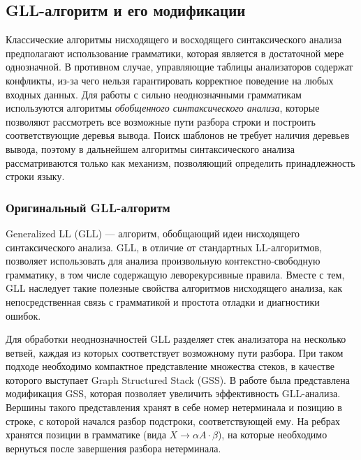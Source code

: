 \subsection{GLL-алгоритм и его модификации}

Классические алгоритмы нисходящего и восходящего синтаксического анализа предполагают использование грамматики, которая является в достаточной мере однозначной. 
В противном случае, управляющие таблицы анализаторов содержат конфликты, из-за чего нельзя гарантировать корректное поведение на любых входных данных. 
Для работы с сильно неоднозначными грамматикам используются алгоритмы \textit{обобщенного синтаксического анализа}, которые позволяют рассмотреть все возможные пути разбора строки и построить соответствующие деревья вывода.
Поиск шаблонов не требует наличия деревьев вывода, поэтому в дальнейшем алгоритмы синтаксического анализа рассматриваются только как механизм, позволяющий определить принадлежность строки языку.

\subsubsection{Оригинальный GLL-алгоритм}

Generalized LL (GLL) \cite{gll} --- алгоритм, обобщающий идеи нисходящего синтаксического анализа. GLL, в отличие от стандартных LL-алгоритмов, позволяет использовать для анализа произвольную \linebreak контекстно-свободную грамматику, в том числе содержащую леворекурсивные правила. Вместе с тем, GLL наследует такие полезные свойства алгоритмов нисходящего анализа, как непосредственная связь с грамматикой и простота отладки и диагностики ошибок.

Для обработки неоднозначностей GLL разделяет стек анализатора на несколько ветвей, каждая из которых соответствует возможному пути разбора. При таком подходе необходимо компактное представление множества стеков, в качестве которого выступает Graph Structured Stack (GSS). В работе \cite{Afroozeh2015gss} была представлена модификация GSS, которая позволяет увеличить эффективность GLL-анализа. Вершины такого представления хранят в себе номер нетерминала и позицию в строке, с которой начался разбор подстроки, соответствующей ему. На ребрах хранятся позиции в грамматике (вида $X \rightarrow \alpha A \cdot \beta$), на которые необходимо вернуться после завершения разбора нетерминала. 

